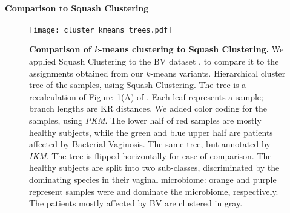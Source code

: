 

\paragraph{Comparison to Squash Clustering}
\label{ch:Clustering:sec:Results:sub:BVDataset:par:SquashClustering}

\begin{figure}[p]
    \centering
    \texttt{[image: cluster\_kmeans\_trees.pdf]}
    \begin{subfigure}{0pt}
        \label{fig:cluster_kmeans_trees:sub:mass_tree}
    \end{subfigure}
    \begin{subfigure}{0pt}
        \label{fig:cluster_kmeans_trees:sub:imbalance_tree}
    \end{subfigure}
    \caption[Comparison of $k$-means clustering to Squash Clustering]{
        \textbf{Comparison of $k$-means clustering to Squash Clustering.}
        We applied Squash Clustering to the \ac{BV} dataset \cite{Srinivasan2012},
        to compare it to the assignments obtained from our $k$-means variants.
        Hierarchical cluster tree of the samples, using Squash Clustering.
        The tree is a recalculation of Figure~1(A) of \cite{Srinivasan2012}.
        Each leaf represents a sample; branch lengths are KR distances.
        We added color coding for the samples, using \emph{PKM}.
        The lower half of red samples are mostly healthy subjects,
        while the green and blue upper half are patients affected by Bacterial Vaginosis.
        The same tree, but annotated by \emph{IKM}.
        The tree is flipped horizontally for ease of comparison.
        The healthy subjects are split into two sub-classes,
        discriminated by the dominating species in their vaginal microbiome:
        orange and purple represent samples were  and 
        dominate the microbiome, respectively.
        The patients mostly affected by BV are clustered in gray.
    }
    \label{fig:cluster_kmeans_trees}
\end{figure}

